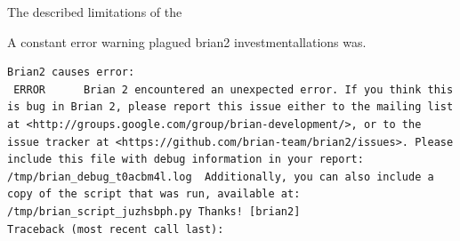 The described limitations of the 

 
\cite{neuralensemble_adexp}
 
\cite{neuralensemble_adexp2}
 
A constant error warning plagued brian2 investmentallations was.
\begin{verbatim}
Brian2 causes error:
 ERROR      Brian 2 encountered an unexpected error. If you think this is bug in Brian 2, please report this issue either to the mailing list at <http://groups.google.com/group/brian-development/>, or to the issue tracker at <https://github.com/brian-team/brian2/issues>. Please include this file with debug information in your report: /tmp/brian_debug_t0acbm4l.log  Additionally, you can also include a copy of the script that was run, available at: /tmp/brian_script_juzhsbph.py Thanks! [brian2]
Traceback (most recent call last):
\end{verbatim}

